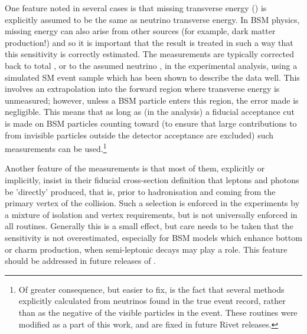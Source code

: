 \documentclass[floatfix]{article}
\begin{document}
One feature noted in several cases is that missing transverse energy (\MET) is 
explicitly assumed to be the same as neutrino transverse energy. In BSM physics, missing energy can also 
arise from other sources (for example, dark matter production!) and so it is important that the result is treated in such a 
way that this sensitivity is correctly estimated. The measurements are typically corrected back to total \MET, 
or to the assumed neutrino \pt, in the experimental analysis, using a simulated SM event sample which has been shown to describe
the data well. This involves an extrapolation into the forward 
region where transverse energy is unmeasured; however, unless a BSM particle enters this region, the error made is 
negligible. This means that as long as (in the \rivet analysis) a fiducial acceptance cut is made on BSM particles 
counting toward \MET (to ensure that large contributions to \MET 
from invisible particles outside the detector acceptance are excluded) such measurements can be 
used.\footnote{Of greater consequence, but easier to fix, is the fact that several \rivet methods explicitly calculated \MET
from neutrinos found in the true event record, rather than as the negative of the visible particles in the event. These 
routines were modified as a part of this work, and are fixed in future Rivet releases.}

Another feature of the measurements is that most of them, explicitly or implicitly, insist in their fiducial cross-section definition 
that leptons and photons be 'directly' produced, that is, prior to hadronisation  and coming from the primary vertex of the collision. 
Such a selection is enforced in the experiments by a mixture of isolation and vertex requirements, but is not universally enforced
in all \rivet routines. Generally this is a small effect, but care needs to be taken that the sensitivity is not overestimated, especially
for BSM models which enhance bottom or charm production, when semi-leptonic decays may play a role.
This feature should be addressed in future releases of \rivet.
\end{document}
